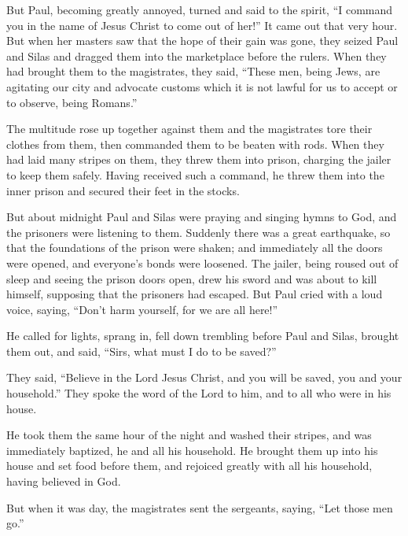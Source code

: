 But Paul, becoming greatly annoyed, turned and said to the spirit, ``I
command you in the name of Jesus Christ to come out of her!'' It came
out that very hour.  But when her masters saw that the
hope of their gain was gone, they seized Paul and Silas and dragged them
into the marketplace before the rulers.  When they had
brought them to the magistrates, they said, ``These men, being Jews, are
agitating our city  and advocate customs which it is not
lawful for us to accept or to observe, being Romans.''

 The multitude rose up together against them and the
magistrates tore their clothes from them, then commanded them to be
beaten with rods.  When they had laid many stripes on
them, they threw them into prison, charging the jailer to keep them
safely.  Having received such a command, he threw them
into the inner prison and secured their feet in the stocks.

 But about midnight Paul and Silas were praying and
singing hymns to God, and the prisoners were listening to them.
 Suddenly there was a great earthquake, so that the
foundations of the prison were shaken; and immediately all the doors
were opened, and everyone's bonds were loosened.  The
jailer, being roused out of sleep and seeing the prison doors open, drew
his sword and was about to kill himself, supposing that the prisoners
had escaped.  But Paul cried with a loud voice, saying,
``Don't harm yourself, for we are all here!''

 He called for lights, sprang in, fell down trembling
before Paul and Silas,  brought them out, and said,
``Sirs, what must I do to be saved?''

 They said, ``Believe in the Lord Jesus Christ, and you
will be saved, you and your household.''  They spoke the
word of the Lord to him, and to all who were in his house.

 He took them the same hour of the night and washed their
stripes, and was immediately baptized, he and all his household.
 He brought them up into his house and set food before
them, and rejoiced greatly with all his household, having believed in
God.

 But when it was day, the magistrates sent the sergeants,
saying, ``Let those men go.''

